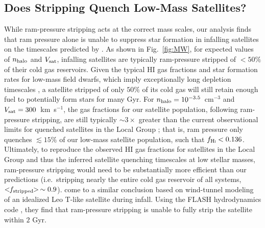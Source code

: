 \documentclass[usenatbib]{mn2e}
\begin{document}


\subsection{Does Stripping Quench Low-Mass Satellites?}
\label{subsec:efficacy}


While ram-pressure stripping acts at the correct mass scales, our
analysis finds that ram pressure alone is unable to suppress star
formation in infalling satellites on the timescales predicted by
\citet{fham15}.
%
As shown in Fig.~\ref{fig:MW}, for expected values of $n_{\rm
  halo}$ and $V_{\rm sat}$, infalling satellites are typically
ram-pressure stripped of $<50\%$ of their cold gas reservoirs.
%
Given the typical H{\scriptsize I} gas fractions and star formation
rates for low-mass field dwarfs, which imply exceptionally long
depletion timescales \citep{skillman03, geha06, schiminovich10}, a
satellite stripped of only $50\%$ of its cold gas will still retain
enough fuel to potentially form stars for many Gyr. 
%
For $n_{\rm halo} = 10^{-3.5}$~cm$^{-3}$ and $V_{\rm sat} =
300$~km~s$^{-1}$, the gas fractions for our satellite population,
following ram-pressure stripping, are still typically $\sim3\times$
greater than the current observational limits for quenched satellites
in the Local Group \citep[i.e.~$f_{\rm H\scalebox{0.45}{\rm
    I}}\lesssim0.136$,][]{spekkens14}; 
%
that is, ram pressure only quenches $\lesssim15\%$ of our low-mass
satellite population, such that $f_{\rm H\scalebox{0.45}{\rm I}} < 0.136$.
%
Ultimately, to reproduce the observed H{\scriptsize I} gas fractions
for satellites in the Local Group and thus the inferred satellite
quenching timescales at low stellar masses, ram-pressure stripping
would need to be substantially more efficient than our predictions
(i.e.~stripping nearly the entire cold gas reservoir of all
systems, $<\!\!f_{\rm stripped}\!\!> \, \sim 0.9$).
%
\citet{emerick16} come to a similar conclusion based on wind-tunnel
modeling of an idealized Leo T-like satellite during infall.
Using the FLASH hydrodynamics code \citep{fryxell00}, they find that
ram-pressure stripping is unable to fully strip the satellite within
$2$ Gyr. 
\end{document}
